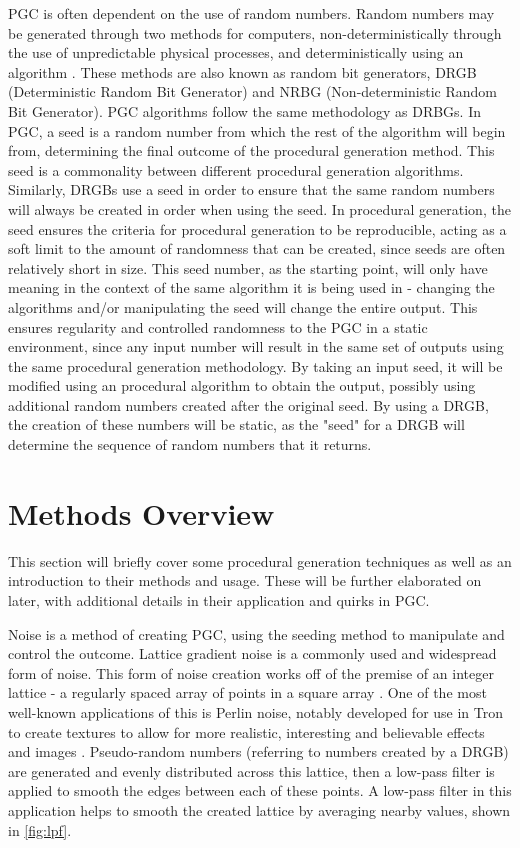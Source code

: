 \documentclass[10pt]{report}
\begin{document}
		PGC is often dependent on the use of random numbers. Random numbers may be generated through two methods for computers, non-deterministically through the use of unpredictable physical processes, and deterministically using an algorithm \cite{rng}. These methods are also known as random bit generators, DRGB (Deterministic Random Bit Generator) and NRBG (Non-deterministic Random Bit Generator). PGC algorithms follow the same methodology as DRBGs. In PGC, a seed is a random number from which the rest of the algorithm will begin from, determining the final outcome of the procedural generation method. This seed is a commonality between different procedural generation algorithms. Similarly, DRGBs use a seed in order to ensure that the same random numbers will always be created in order when using the seed. In procedural generation, the seed ensures the criteria for procedural generation to be reproducible, acting as a soft limit to the amount of randomness that can be created, since seeds are often relatively short in size. This seed number, as the starting point, will only have meaning in the context of the same algorithm it is being used in - changing the algorithms and/or manipulating the seed will change the entire output. This ensures regularity and controlled randomness to the PGC in a static environment, since any input number will result in the same set of outputs using the same procedural generation methodology. By taking an input seed, it will be modified using an procedural algorithm to obtain the output, possibly using additional random numbers created after the original seed. By using a DRGB, the creation of these numbers will be static, as the "seed" for a DRGB will determine the sequence of random numbers that it returns.
	
		\section{Methods Overview}
		This section will briefly cover some procedural generation techniques as well as an introduction to their methods and usage. These will be further elaborated on later, with additional details in their application and quirks in PGC. 
		
		Noise is a method of creating PGC, using the seeding method to manipulate and control the outcome. Lattice gradient noise is a commonly used and widespread form of noise. This form of noise creation works off of the premise of an integer lattice - a regularly spaced array of points in a square array \cite{integer-lattice}. One of the most well-known applications of this is Perlin noise, notably developed for use in Tron \cite{tron} to create textures to allow for more realistic, interesting and believable effects and images \cite{ken-perlin}. Pseudo-random numbers (referring to numbers created by a DRGB) are generated and evenly distributed across this lattice, then a low-pass filter is applied to smooth the edges between each of these points. A low-pass filter in this application helps to smooth the created lattice by averaging nearby values, shown in \autoref{fig:lpf}. 
		
\end{document}
